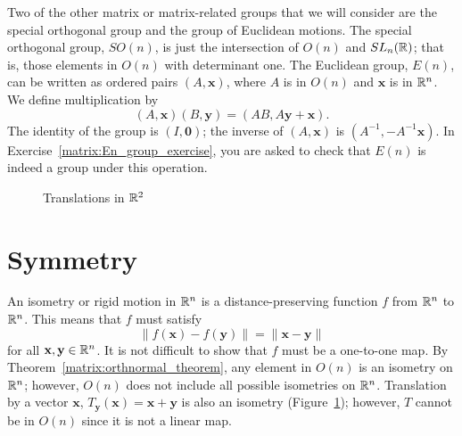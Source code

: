  
 
Two of the other matrix or matrix-related groups that we will consider
are the special orthogonal group  and the group of Euclidean motions.
The {\bfi special orthogonal group},
$SO(n)$\label{notespecialorthog}, is just the intersection of $O(n)$
and $SL_n({\Bbb R})$; that is, those elements in $O(n)$ with determinant
one. The {\bfi Euclidean
group},
$E(n)$\label{noteeuclidgroup}, can be written as ordered pairs $(A,
{\mathbf x})$, where $A$ is in $O(n)$ and ${\mathbf x}$ is in ${\Bbb
R}^n$. We define multiplication by
\[
(A, {\mathbf x}) (B, {\mathbf y})
=
(AB, A {\mathbf y} +{\mathbf x}).
\]
The identity of the group is $(I,{\mathbf 0})$; the inverse of $(A,
{\mathbf x})$ is $(A^{-1}, -A^{-1} {\mathbf x})$. In Exercise~\ref{matrix:En_group_exercise}, you 
are asked to check that $E(n)$ is indeed a group under this operation.
 
 
 
 
\begin{figure}[hbt]

\begin{center}
\end{center}
\caption{Translations in ${\Bbb R}^2$}
\label{Isometries}
\end{figure}
 
 
 
 
 
\section{Symmetry}
 
 
 
 
An {\bfi isometry\/} or {\bfi rigid
motion\/} in ${\Bbb R}^n$  is a
distance-preserving function $f$ from ${\Bbb R}^n$ to ${\Bbb R}^n$.
This means that $f$ must satisfy 
\[
\| f({\mathbf x}) - f({\mathbf y}) \| =
\|{\mathbf x} - {\mathbf y} \|
\]
for all ${\mathbf x}, {\mathbf y} \in {\Bbb R}^n$. It is not difficult to
show that $f$ must be a one-to-one map. By Theorem~\ref{matrix:orthnormal_theorem}, any element in
$O(n)$ is an isometry on ${\Bbb R}^n$; however, $O(n)$ does not
include all possible isometries on ${\Bbb R}^n$. Translation by a
vector ${\mathbf x}$, $T_{\mathbf y}({\mathbf x}) = {\mathbf x} + {\mathbf y}$
is also an isometry (Figure~\ref{Isometries}); however, $T$ cannot be
in $O(n)$ since it is not a linear map. 
 
